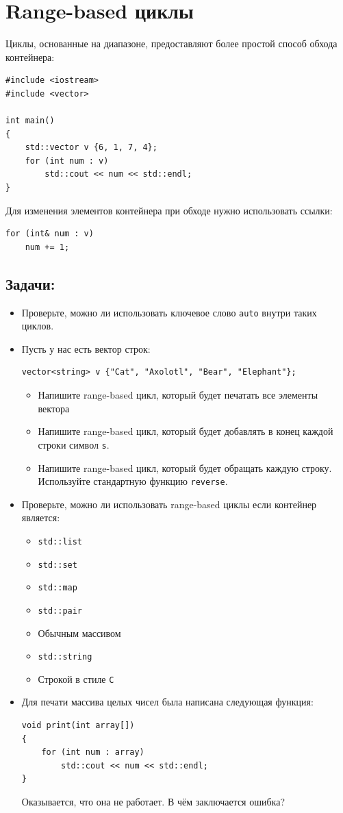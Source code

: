 \documentclass{article}
\begin{document}
\newpage
\section*{Range-based циклы}
Циклы, основанные на диапазоне, предоставляют более простой способ обхода контейнера:
\begin{lstlisting}
#include <iostream>
#include <vector>

int main()
{
    std::vector v {6, 1, 7, 4};
    for (int num : v)
    	std::cout << num << std::endl;    
}
\end{lstlisting}
Для изменения элементов контейнера при обходе нужно использовать ссылки:
\begin{lstlisting}
for (int& num : v)
    num += 1;    
\end{lstlisting}

\subsection*{Задачи:}
\begin{itemize}
\item Проверьте, можно ли использовать ключевое слово \texttt{auto} внутри таких циклов.
\item Пусть у нас есть вектор строк:
\begin{lstlisting}
vector<string> v {"Cat", "Axolotl", "Bear", "Elephant"};
\end{lstlisting}
\begin{itemize}
\item Напишите range-based цикл, который будет печатать все элементы вектора
\item Напишите range-based цикл, который будет добавлять в конец каждой строки символ \texttt{s}.
\item Напишите range-based цикл, который будет обращать каждую строку. Используйте стандартную функцию \texttt{reverse}.
\end{itemize}

\item Проверьте, можно ли использовать range-based циклы если контейнер является:
\begin{multicols}{2}
\begin{itemize}
\item \texttt{std::list}
\item \texttt{std::set}
\item \texttt{std::map}
\item \texttt{std::pair}
\item Обычным массивом
\item \texttt{std::string}
\item Строкой в стиле \texttt{C}
\end{itemize}
\end{multicols}

\item Для печати массива целых чисел была написана следующая функция:
\begin{lstlisting}
void print(int array[]) 
{
    for (int num : array)
        std::cout << num << std::endl;
}
\end{lstlisting}
Оказывается, что она не работает. В чём заключается ошибка?
\end{itemize}
\end{document}
